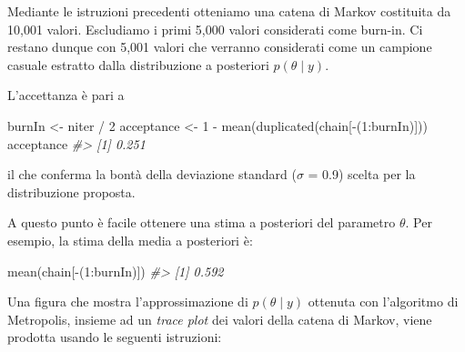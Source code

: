 \documentclass[
  10pt,
  italian,
  a4paper,
  extrafontsizes,onecolumn,openright
  ]{memoir}
\newenvironment{Shaded}{\begin{snugshade}}{\end{snugshade}}
\newcommand{\CommentTok}[1]{\textcolor[rgb]{0.56,0.35,0.01}{\textit{#1}}}
\newcommand{\DecValTok}[1]{\textcolor[rgb]{0.00,0.00,0.81}{#1}}
\newcommand{\FunctionTok}[1]{\textcolor[rgb]{0.00,0.00,0.00}{#1}}
\newcommand{\NormalTok}[1]{#1}
\newcommand{\OtherTok}[1]{\textcolor[rgb]{0.56,0.35,0.01}{#1}}
\newcommand{\SpecialCharTok}[1]{\textcolor[rgb]{0.00,0.00,0.00}{#1}}
\begin{document}
Mediante le istruzioni precedenti otteniamo una catena di Markov costituita da 10,001 valori. Escludiamo i primi 5,000 valori considerati come burn-in. Ci restano dunque con 5,001 valori che verranno considerati come un campione casuale estratto dalla distribuzione a posteriori \(p(\theta \mid y)\).

L'accettanza è pari a

\begin{Shaded}
\begin{Highlighting}[]
\NormalTok{burnIn }\OtherTok{\textless{}{-}}\NormalTok{ niter }\SpecialCharTok{/} \DecValTok{2}
\NormalTok{acceptance }\OtherTok{\textless{}{-}} \DecValTok{1} \SpecialCharTok{{-}} \FunctionTok{mean}\NormalTok{(}\FunctionTok{duplicated}\NormalTok{(chain[}\SpecialCharTok{{-}}\NormalTok{(}\DecValTok{1}\SpecialCharTok{:}\NormalTok{burnIn)]))}
\NormalTok{acceptance}
\CommentTok{\#\textgreater{} [1] 0.251}
\end{Highlighting}
\end{Shaded}

\noindent
il che conferma la bontà della deviazione standard (\(\sigma\) = 0.9) scelta per la distribuzione proposta.

A questo punto è facile ottenere una stima a posteriori del parametro \(\theta\). Per esempio, la stima della media a posteriori è:

\begin{Shaded}
\begin{Highlighting}[]
\FunctionTok{mean}\NormalTok{(chain[}\SpecialCharTok{{-}}\NormalTok{(}\DecValTok{1}\SpecialCharTok{:}\NormalTok{burnIn)])}
\CommentTok{\#\textgreater{} [1] 0.592}
\end{Highlighting}
\end{Shaded}

Una figura che mostra l'approssimazione di \(p(\theta \mid y)\) ottenuta con l'algoritmo di Metropolis, insieme ad un \emph{trace plot} dei valori della catena di Markov, viene prodotta usando le seguenti istruzioni:
\end{document}
